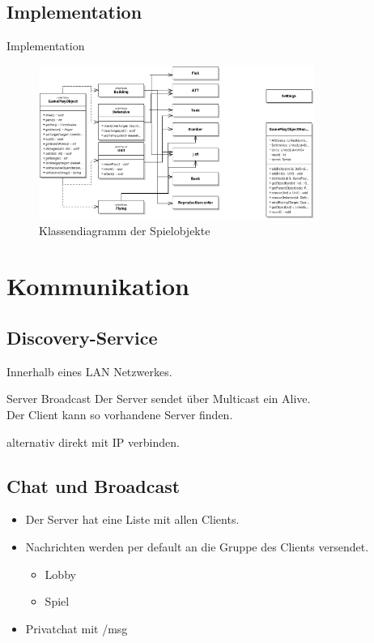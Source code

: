 \documentclass[12pt, utf8]{beamer}
\begin{document}
\subsection{Implementation}
\begin{frame}{Implementation}
\begin{figure}
\includegraphics[width=9cm]{images/GamePlayObjects.ps}
\caption{Klassendiagramm der Spielobjekte}
\end{figure}
\end{frame}

 
\section{Kommunikation}
\subsection{Discovery-Service}
\begin{frame}
Innerhalb eines LAN Netzwerkes.
\begin{exampleblock}{Server Broadcast}
Der Server sendet über Multicast ein Alive. \\
Der Client kann so vorhandene Server finden.\
\end{exampleblock}
alternativ direkt mit IP verbinden.
\end{frame}

\subsection{Chat und Broadcast}
\begin{frame}
	\begin{itemize}
		\item Der Server hat eine Liste mit allen Clients.
		\item Nachrichten werden per default an die Gruppe des Clients versendet.
			\begin{itemize}
				\item Lobby
				\item Spiel
			\end{itemize}
		\item Privatchat mit /msg
	\end{itemize}
\end{frame}
\end{document}
